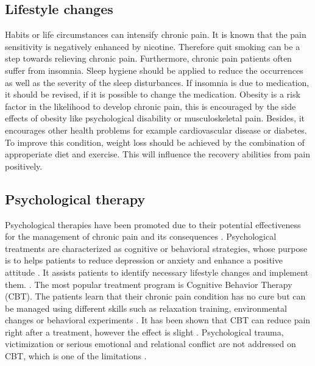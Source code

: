 \subsection{Lifestyle changes}
Habits or life circumstances can intensify chronic pain. It is known that the pain sensitivity is negatively enhanced by nicotine. Therefore quit smoking can be a step towards relieving chronic pain.
Furthermore, chronic pain patients often suffer from insomnia. Sleep hygiene should be applied to reduce the occurrences as well as the severity of the sleep disturbances. If insomnia is due to medication, it should be revised, if it is possible to change the medication.
Obesity is a risk factor in the likelihood to  develop chronic pain, this is encouraged by the side effects of obesity like psychological disability or musculoskeletal pain. Besides, it encourages other health problems for example cardiovascular disease or diabetes. To improve this condition, weight loss should be achieved by the combination of approperiate diet and exercise. This will influence the recovery abilities from pain positively. \cite{marcus2009,pope2017}

\subsection{Psychological therapy}

Psychological therapies have been promoted due to their potential effectiveness for the management of chronic pain and its consequences \cite{Eccleston2002}. Psychological treatments are characterized as cognitive or behavioral strategies, whose purpose is to helps patients to reduce depression or anxiety and enhance a positive attitude \cite{Eccleston2013}. It assists patients to identify necessary lifestyle changes and implement them. \cite{marcus2009,pope2017}. The most popular treatment program is Cognitive Behavior Therapy (CBT). The patients learn that their chronic pain condition has no cure but can be managed using different skills such as relaxation training, environmental changes or behavioral experiments \cite{Burger2016}. It has been shown that CBT can reduce pain right after a treatment, however the effect is slight \cite{Eccleston2013}. Psychological trauma, victimization or serious emotional and relational conflict are not addressed on CBT, which is one of the limitations \cite{Burger2016}.


